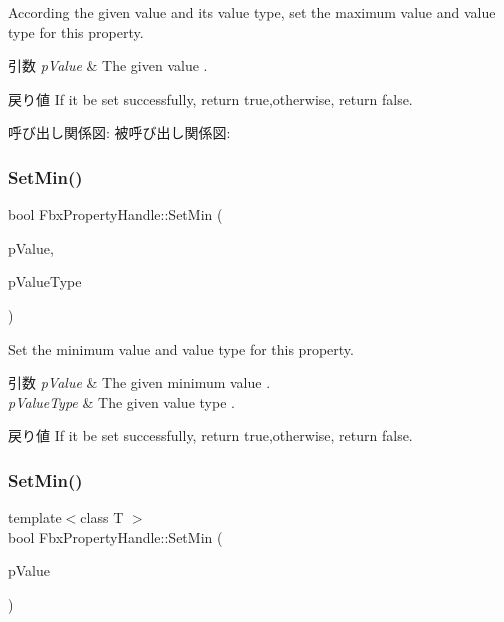 According the given value and its value type, set the maximum value and value type for this property. 
\begin{DoxyParams}{引数}
{\em p\+Value} & The given value . \\
\hline
\end{DoxyParams}
\begin{DoxyReturn}{戻り値}
If it be set successfully, return true,otherwise, return false. 
\end{DoxyReturn}
呼び出し関係図\+:
被呼び出し関係図\+:
\mbox{\label{class_fbx_property_handle_a699f3d09a345e575b75ebe97c089b82c}} 
\subsubsection{\texorpdfstring{Set\+Min()}{SetMin()}\hspace{0.1cm}{\footnotesize\ttfamily [1/2]}}
{\footnotesize\ttfamily bool Fbx\+Property\+Handle\+::\+Set\+Min (\begin{DoxyParamCaption}\item[{const void $\ast$}]{p\+Value,  }\item[{\hyperlink{fbxpropertytypes_8h_a73913a5ddfb20e57c6f25e9e6784bd92}{E\+Fbx\+Type}}]{p\+Value\+Type }\end{DoxyParamCaption})}

Set the minimum value and value type for this property. 
\begin{DoxyParams}{引数}
{\em p\+Value} & The given minimum value . \\
\hline
{\em p\+Value\+Type} & The given value type . \\
\hline
\end{DoxyParams}
\begin{DoxyReturn}{戻り値}
If it be set successfully, return true,otherwise, return false. 
\end{DoxyReturn}
\mbox{\label{class_fbx_property_handle_ab37a7e2831a4ca20879d4b8b57877361}} 
\subsubsection{\texorpdfstring{Set\+Min()}{SetMin()}\hspace{0.1cm}{\footnotesize\ttfamily [2/2]}}
{\footnotesize\ttfamily template$<$class T $>$ \\
bool Fbx\+Property\+Handle\+::\+Set\+Min (\begin{DoxyParamCaption}\item[{const T \&}]{p\+Value }\end{DoxyParamCaption})}

